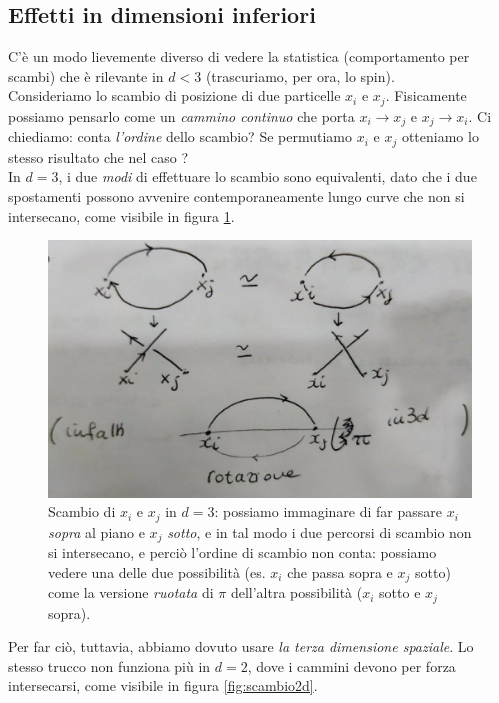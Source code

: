 \documentclass[../../FisicaTeorica.tex]{subfiles}
\begin{document}
\subsection{Effetti in dimensioni inferiori}
C'è un modo lievemente diverso di vedere la statistica (comportamento per scambi) che è rilevante in $d<3$ (trascuriamo, per ora, lo spin).\\
Consideriamo lo scambio di posizione di due particelle $x_i$ e $x_j$. Fisicamente possiamo pensarlo come un \textit{cammino continuo} che porta $x_i \to x_j$ e $x_j \to x_i$. Ci chiediamo: conta \textit{l'ordine} dello scambio? Se permutiamo $x_i$ e $x_j$  otteniamo lo stesso risultato che nel caso ?\\
In $d=3$, i due \textit{modi} di effettuare lo scambio sono equivalenti, dato che i due spostamenti possono avvenire contemporaneamente lungo curve che non si intersecano, come visibile in figura \ref{fig:scambio3d}.
\begin{figure}[H]
\centering
\includegraphics[scale=0.3]{Immagini/12_12/image005.jpg}
\caption{Scambio di $x_i$ e $x_j$ in $d=3$: possiamo immaginare di far passare $x_i$ \textit{sopra} al piano e $x_j$ \textit{sotto}, e in tal modo i due percorsi di scambio non si intersecano, e perciò l'ordine di scambio non conta: possiamo vedere una delle due possibilità (es. $x_i$ che passa sopra e $x_j$ sotto) come la versione \textit{ruotata} di $\pi$ dell'altra possibilità ($x_i$ sotto e $x_j$ sopra).\label{fig:scambio3d}}
\end{figure}
Per far ciò, tuttavia, abbiamo dovuto usare \textit{la terza dimensione spaziale}. Lo stesso trucco non funziona più in $d=2$, dove i cammini devono per forza intersecarsi, come visibile in figura \ref{fig:scambio2d}.
\end{document}
